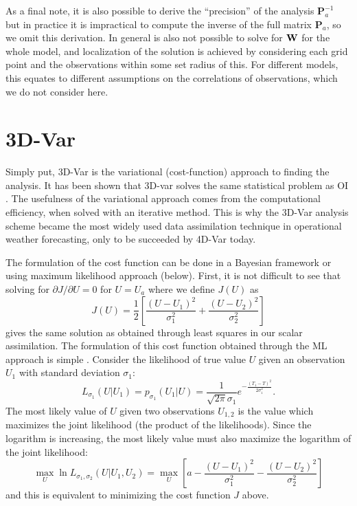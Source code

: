 As a final note, it is also possible to derive the ``precision'' of the analysis $\mathbf{P} _a ^{-1}$ but in practice it is impractical to compute the inverse of the full matrix $\mathbf{P}_a$, so we omit this derivation.
In general is also not possible to solve for $\mathbf{W}$ for the whole model, and localization of the solution is achieved by considering each grid point and the observations within some set radius of this.
For different models, this equates to different assumptions on the correlations of observations, which we do not consider here.

\section{3D-Var}

Simply put, 3D-Var is the variational (cost-function) approach to finding the analysis.
It has been shown that 3D-var solves the same statistical problem as OI .
The usefulness of the variational approach comes from the computational efficiency, when solved with an iterative method.
This is why the 3D-Var analysis scheme became the most widely used data assimilation technique in operational weather forecasting, only to be succeeded by 4D-Var today.

The formulation of the cost function can be done in a Bayesian framework  or using maximum likelihood approach (below).
First, it is not difficult to see that solving for $\partial J/ \partial U = 0$ for $U = U_a$ where we define $J(U)$ as
\begin{equation} J(U) = \frac{1}{2} \left [ \frac{(U-U_1)^2}{\sigma_1^2}+\frac{(U-U_2)^2}{\sigma_2^2} \right ] \end{equation}
gives the same solution as obtained through least squares in our scalar assimilation.
The formulation of this cost function obtained through the ML approach is simple .
Consider the likelihood of true value $U$ given an observation $U_1$ with standard deviation $\sigma_1$:
\begin{equation} L_{\sigma_1}(U|U_1)=p_{\sigma_1}(U_1|U)=\frac{1}{\sqrt{2\pi}\sigma_1}e^{-\frac{(T_1-T)^2}{2\sigma_1^2}} .\end{equation}
The most likely value of $U$ given two observations $U_{1,2}$ is the value which maximizes the joint likelihood (the product of the likelihoods).
Since the logarithm is increasing, the most likely value must also maximize the logarithm of the joint likelihood:
\begin{equation} \max_U \ln L_{\sigma_1,\sigma_2} (U|U_{1},U_{2}) = \max _U \left [ a - \frac{(U-U_1)^2}{\sigma_1^2}-\frac{(U-U_2)^2}{\sigma_2^2} \right ] \end{equation}
and this is equivalent to minimizing the cost function $J$ above.


